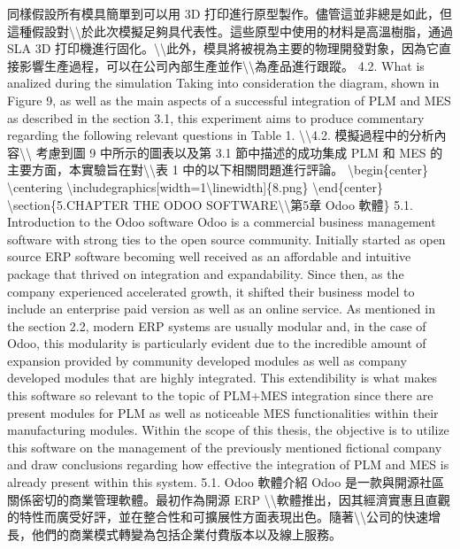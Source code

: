 同樣假設所有模具簡單到可以用 3D
打印進行原型製作。儘管這並非總是如此，但這種假設對\textbackslash\textbackslash 於此次模擬足夠具代表性。這些原型中使用的材料是高溫樹脂，通過
SLA 3D
打印機進行固化。\textbackslash\textbackslash 此外，模具將被視為主要的物理開發對象，因為它直接影響生產過程，可以在公司內部生產並作\textbackslash\textbackslash 為產品進行跟蹤。
4.2. What is analized during the simulation Taking into consideration
the diagram, shown in Figure 9, as well as the main aspects of a
successful integration of PLM and MES as described in the section 3.1,
this experiment aims to produce commentary regarding the following
relevant questions in Table 1. \textbackslash\textbackslash4.2.
模擬過程中的分析內容\textbackslash\textbackslash{} 考慮到圖 9
中所示的圖表以及第 3.1 節中描述的成功集成 PLM 和 MES
的主要方面，本實驗旨在對\textbackslash\textbackslash 表 1
中的以下相關問題進行評論。 \textbackslash begin\{center\}
\textbackslash centering
\textbackslash includegraphics{[}width=1\textbackslash linewidth{]}\{8.png\}
\textbackslash end\{center\} \textbackslash section\{5.CHAPTER THE ODOO
SOFTWARE\textbackslash\textbackslash 第5章 Odoo 軟體\} 5.1. Introduction
to the Odoo software Odoo is a commercial business management software
with strong ties to the open source community. Initially started as open
source ERP software becoming well received as an affordable and
intuitive package that thrived on integration and expandability. Since
then, as the company experienced accelerated growth, it shifted their
business model to include an enterprise paid version as well as an
online service. As mentioned in the section 2.2, modern ERP systems are
usually modular and, in the case of Odoo, this modularity is
particularly evident due to the incredible amount of expansion provided
by community developed modules as well as company developed modules that
are highly integrated. This extendibility is what makes this software so
relevant to the topic of PLM+MES integration since there are present
modules for PLM as well as noticeable MES functionalities within their
manufacturing modules. Within the scope of this thesis, the objective is
to utilize this software on the management of the previously mentioned
fictional company and draw conclusions regarding how effective the
integration of PLM and MES is already present within this system. 5.1.
Odoo 軟體介紹 Odoo 是一款與開源社區關係密切的商業管理軟體。最初作為開源
ERP
\textbackslash\textbackslash 軟體推出，因其經濟實惠且直觀的特性而廣受好評，並在整合性和可擴展性方面表現出色。隨著\textbackslash\textbackslash 公司的快速增長，他們的商業模式轉變為包括企業付費版本以及線上服務。

